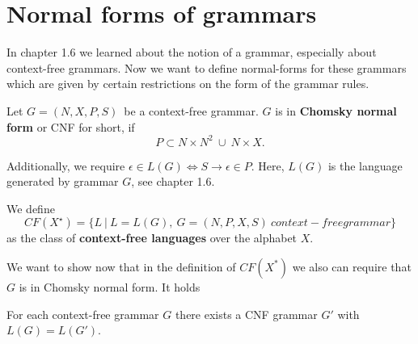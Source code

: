 \section{Normal forms of grammars}

In chapter 1.6 we learned about the notion of a grammar, especially about context-free grammars.
Now we want to define normal-forms for these grammars which are given by certain restrictions on the form of the
grammar rules.

\begin{definition}
Let $G = (N, X, P, S)$\ be a context-free grammar. $G$ is in \textbf{Chomsky normal form} or CNF for short, if
\[
P \subset N \times N^{2}\  \cup\ N \times X.
\]
\end{definition}

Additionally, we require $\epsilon \in L(G) \iff S \rightarrow \epsilon \in P.$ Here, $L(G) $ is the language generated
by grammar $G$, see chapter 1.6.

We define
\[
CF(X^{\star}) = \{ L\ |\ L = L(G),\ G = (N, P, X, S)\ context-free grammar \}
\]
as the class of \textbf{context-free languages} over the alphabet $X$.

We want to show now that in the definition of $CF(X^{*})$ we also can require that $G$ is in Chomsky normal form.
It holds

\begin{theorem}
For each context-free grammar $G$ there exists a CNF grammar $G'$ with $L(G) = L(G')$.
\end{theorem}

